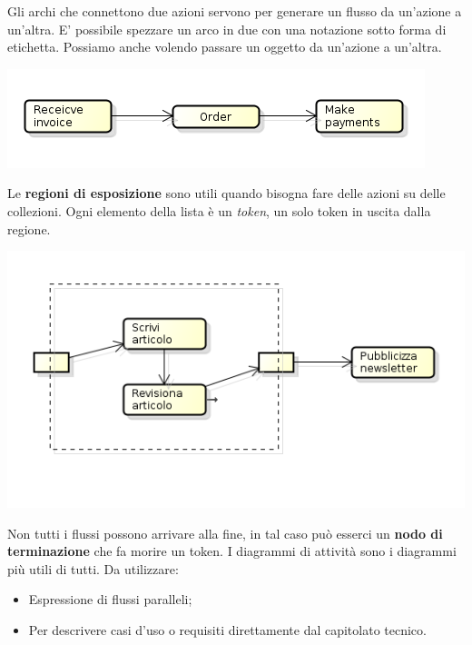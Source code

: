 Gli archi che connettono due azioni servono per generare un flusso da un'azione a un'altra. E' possibile spezzare un arco in due con una notazione sotto forma di etichetta. Possiamo anche volendo passare un oggetto da un'azione a un'altra.

\begin{center}

\includegraphics[width=0.75\columnwidth]{img2} %

\end{center}

Le \textbf{regioni di esposizione} sono utili quando bisogna fare delle azioni su delle collezioni. Ogni elemento della lista è un \textit{token}, un solo token in uscita dalla regione.

\begin{center}

\includegraphics[width=0.75\columnwidth]{img3} %

\end{center}

Non tutti i flussi possono arrivare alla fine, in tal caso può esserci un \textbf{nodo di terminazione} che fa morire un token. I diagrammi di attività sono i diagrammi più utili di tutti. Da utilizzare:

\begin{itemize}

	\item Espressione di flussi paralleli;
	\item Per descrivere casi d'uso o requisiti direttamente dal capitolato tecnico.

\end{itemize}

